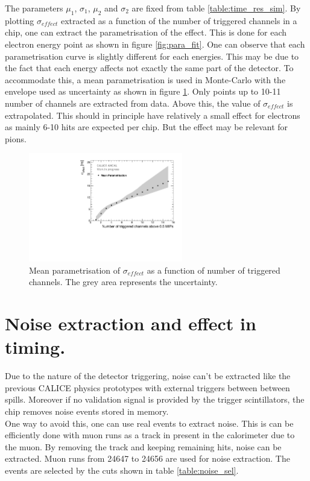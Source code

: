 The parameters $\mu_1$, $\sigma_1$, $\mu_2$ and $\sigma_2$ are fixed from table \ref{table:time_res_sim}. By plotting $\sigma_{effect}$ extracted as a function of the number of triggered channels in a chip, one can extract the parametrisation of the effect. This is done for each electron energy point as shown in figure \ref{fig:para_fit}. One can observe that each parametrisation curve is slightly different for each energies. This may be due to the fact that each energy affects not exactly the same part of the detector. To accommodate this, a mean parametrisation is used in Monte-Carlo with the envelope used as uncertainty as shown in figure \ref{fig:mean_para}. Only points up to 10-11 number of channels are extracted from data. Above this, the value of $\sigma_{effect}$ is extrapolated. This should in principle have relatively a small effect for electrons as mainly 6-10 hits are expected per chip. But the effect may be relevant for pions.

\begin{figure}[htbp]
\begin{center}
\includegraphics[width=0.6\textwidth]{chap5/fig_AHCAL_timing/Electrons/MeanParametrisationWithSystErrors.pdf}
\caption{Mean parametrisation of $\sigma_{effect}$ as a function of number of triggered channels. The grey area represents the uncertainty.}
\label{fig:mean_para}
\end{center}
\end{figure}

\newpage
\section{Noise extraction and effect in timing.}
\label{appendix:noise}

Due to the nature of the detector triggering, noise can't be extracted like the previous CALICE physics prototypes with external triggers between between spills. Moreover if no validation signal is provided by the trigger scintillators, the chip removes noise events stored in memory.\\
One way to avoid this, one can use real events to extract noise. This is can be efficiently done with muon runs as a track in present in the calorimeter due to the muon. By removing the track and keeping remaining hits, noise can be extracted. Muon runs from 24647 to 24656 are used for noise extraction. The events are selected by the cuts shown in table \ref{table:noise_sel}.

